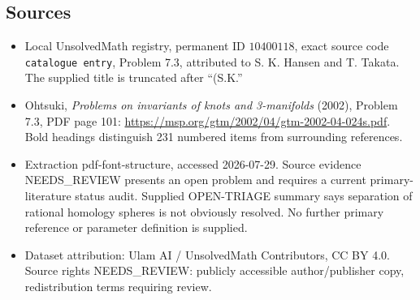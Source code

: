 \documentclass[11pt]{article}
\begin{document}
\subsection{Sources}
\begin{itemize}
\item Local UnsolvedMath registry, permanent ID \(10400118\), exact source code \texttt{catalogue entry}, Problem 7.3, attributed to S. K. Hansen and T. Takata. The supplied title is truncated after ``(S.K.''
\item Ohtsuki, \emph{Problems on invariants of knots and 3-manifolds} (2002), Problem 7.3, PDF page 101: \url{https://msp.org/gtm/2002/04/gtm-2002-04-024s.pdf}. Bold headings distinguish 231 numbered items from surrounding references.
\item Extraction pdf-font-structure, accessed 2026-07-29. Source evidence NEEDS\_REVIEW presents an open problem and requires a current primary-literature status audit. Supplied OPEN-TRIAGE summary says separation of rational homology spheres is not obviously resolved. No further primary reference or parameter definition is supplied.
\item Dataset attribution: Ulam AI / UnsolvedMath Contributors, CC BY 4.0. Source rights NEEDS\_REVIEW: publicly accessible author/publisher copy, redistribution terms requiring review.
\end{itemize}
\end{document}
